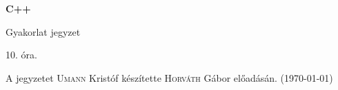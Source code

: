 \documentclass[a4paper,11.5pt]{article}
\begin{document}
	\setlength\parindent{0pt}
	\def\s{\hspace{0.2mm}\vphantom{\beta}}
	\def\Z{\mathbb{Z}}
	\def\Q{\mathbb{Q}}
	\def\R{\mathbb{R}}
	\def\C{\mathbb{C}}
	\def\N{\mathbb{N}}
	\def\Ra{\overline{\mathbb{R}}}
	
	\def\sume{\displaystyle\sum_{n=1}^{+\infty}}
	\def\sumn{\displaystyle\sum_{n=0}^{+\infty}}
	
	\def\narrow{\underset{n\rightarrow+\infty}{\longrightarrow}}
	\def\limn{\displaystyle\lim_{n\to +\infty}}
	\def\limx{\displaystyle\lim_{x\to +\infty}}
	
	\theoremstyle{definition}
	\newtheorem{theorem}{Tétel}[subsection] 
	
	\theoremstyle{definition}
	\newtheorem{definition}[theorem]{Definíció} 
	\newtheorem{example}[theorem]{Példa} 
	\newtheorem{task}[theorem]{Feladat} 
	\newtheorem{note}[theorem]{Megjegyzés}
	\begin{center}
		{\LARGE\textbf{C++}}
		
		{\Large Gyakorlat jegyzet}
		
		10. óra.
	\end{center}
	A jegyzetet \textsc{Umann} Kristóf készítette \textsc{Horváth} Gábor  előadásán. (\today)
\end{document}
